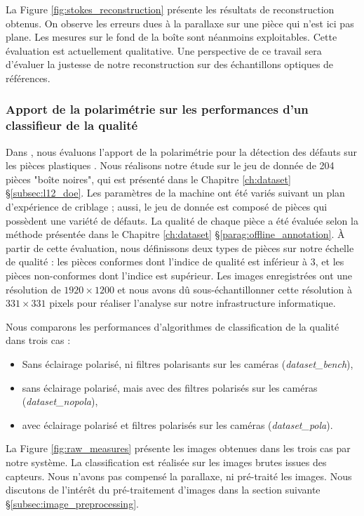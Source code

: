 La Figure \ref{fig:stokes_reconstruction} présente les résultats de reconstruction obtenus.
On observe les erreurs dues à la parallaxe sur une pièce qui n'est ici pas plane.
Les mesures sur le fond de la boîte sont néanmoins exploitables.
Cette évaluation est actuellement qualitative.
Une perspective de ce travail sera d'évaluer la justesse de notre reconstruction sur des échantillons optiques de références.


\subsubsection{Apport de la polarimétrie sur les performances d'un classifieur de la qualité}
\label{subsubsec:pola_results}

Dans , nous évaluons l'apport de la polarimétrie pour la détection des défauts sur les pièces plastiques \cite{nagorny_polarimetric_2019}.
Nous réalisons notre étude sur le jeu de donnée de 204 pièces "boîte noires", qui est présenté dans le Chapitre \ref{ch:dataset} §\ref{subsec:l12_doe}.
Les paramètres de la machine ont été variés suivant un plan d'expérience de criblage ; aussi, le jeu de donnée est composé de pièces qui possèdent une variété de défauts.
La qualité de chaque pièce a été évaluée selon la méthode présentée dans le Chapitre \ref{ch:dataset} §\ref{parag:offline_annotation}.
À partir de cette évaluation, nous définissons deux types de pièces sur notre échelle de qualité : les pièces conformes dont l'indice de qualité est inférieur à 3, et les pièces non-conformes dont l'indice est supérieur.
Les images enregistrées ont une résolution de $1920 \times 1200$ et nous avons dû sous-échantillonner cette résolution à $331 \times 331$ pixels pour réaliser l'analyse sur notre infrastructure informatique.

Nous comparons les performances d'algorithmes de classification de la qualité dans trois cas :
\begin{itemize}
	\item 
	Sans éclairage polarisé, ni filtres polarisants sur les caméras (\textit{dataset\_bench}),
	\item 
	sans éclairage polarisé, mais avec des filtres polarisés sur les caméras (\textit{dataset\_nopola}),
	\item avec éclairage polarisé et filtres polarisés sur les caméras (\textit{dataset\_pola}).
\end{itemize}
La Figure \ref{fig:raw_measures} présente les images obtenues dans les trois cas par notre système.
La classification est réalisée sur les images brutes issues des capteurs.
Nous n'avons pas compensé la parallaxe, ni pré-traité les images.
Nous discutons de l'intérêt du pré-traitement d'images dans la section suivante §\ref{subsec:image_preprocessing}.

